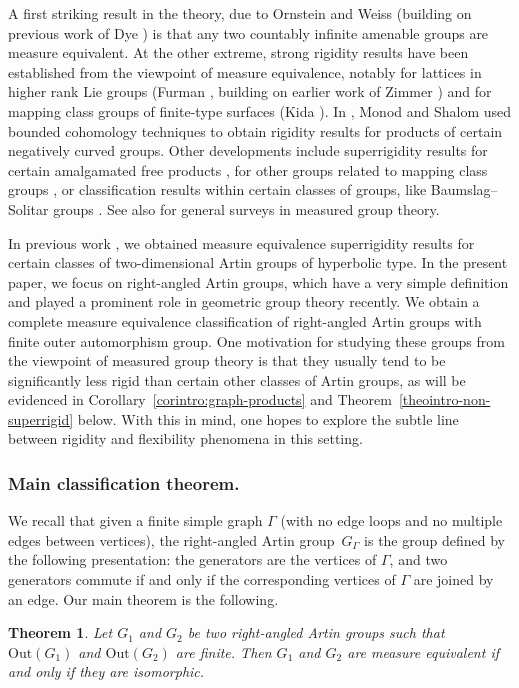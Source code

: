 \documentclass[JEP,XML,SOM,Unicode,NoFloatCountersInSection,published]{cedram}
\theoremstyle{plain}
\newtheorem{theointro}{Theorem}
\theoremstyle{definition}
\newcommand{\Out}{\mathrm{Out}}
\begin{document}
A first striking result in the theory, due to Ornstein and Weiss \cite{OW} (building on previous work of Dye \cite{Dye1,Dye2}) is that any two countably infinite amenable groups are measure equivalent. At the other extreme, strong rigidity results have been established from the viewpoint of measure equivalence, notably for lattices in higher rank Lie groups (Furman \cite{Fur}, building on earlier work of Zimmer \cite{Zim1,Zim2}) and for mapping class groups of finite-type surfaces (Kida \cite{Kid}). In \cite{MS}, Monod and Shalom used bounded cohomology techniques to obtain rigidity results for products of certain negatively curved groups. Other developments include superrigidity results for certain amalgamated free products \cite{Kid2}, for other groups related to mapping class groups \cite{CK}, or classification results within certain classes of groups, like Baumslag--Solitar groups \cite{kida2014invariants,HR}. See also \cite{Sha-survey,Gab-survey,Fur-survey} for general surveys in measured group theory.

In previous work \cite{HH}, we obtained measure equivalence superrigidity results for certain classes of two-dimensional Artin groups of hyperbolic type. In the present paper, we focus on right-angled Artin groups, which have a very simple definition and played a prominent role in geometric group theory recently.
We obtain a complete measure equivalence classification of right-angled Artin groups with finite outer automorphism group. One motivation for studying these groups from the viewpoint of measured group theory is that they usually tend to be significantly less rigid than certain other classes of Artin groups, as will be evidenced in Corollary~\ref{corintro:graph-products} and Theorem~\ref{theointro-non-superrigid} below. With this in mind, one hopes to explore the subtle line between rigidity and flexibility phenomena in this setting.

\subsubsection*{Main classification theorem.} We recall that given a finite simple graph $\Gamma$ (\ie with no edge loops and no multiple edges between vertices), the right-angled Artin group~$G_\Gamma$ is the group defined by the following presentation: the generators are the vertices of $\Gamma$, and two generators commute if and only if the corresponding vertices of $\Gamma$ are joined by an edge. Our main theorem is the following.

\begin{theointro}\label{theointro:1}
Let $G_1$ and $G_2$ be two right-angled Artin groups such that $\Out(G_1)$ and $\Out(G_2)$ are finite. Then $G_1$ and $G_2$ are measure equivalent if and only if they are isomorphic.
\end{theointro}
\end{document}
